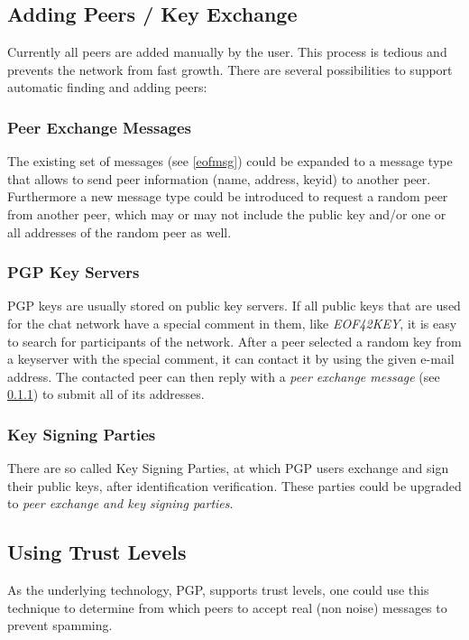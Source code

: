 \subsection{Adding Peers / Key Exchange}
\label{keyexchange}
Currently all peers are added manually by the user. 
This process is tedious and prevents the network from fast growth.
There are several possibilities to support automatic finding and
adding peers:
\subsubsection{Peer Exchange Messages}
\label{peerexchange}
The existing set of messages (see \ref{eofmsg}) could be expanded to a message
type that allows to send peer information (name, address, keyid) to another
peer. Furthermore a new message type could be introduced to request a random
peer from another peer, which may or may not include the public key 
and/or one or all addresses of the random peer as well.
\subsubsection{PGP Key Servers}
PGP keys are usually stored on public key servers.
If all public keys that are used for the chat network have a special comment
in them, like \textit{EOF42KEY}, it is easy to search for participants of the
network. After a peer selected a random key from a keyserver with the
special comment, it can contact it by using the given e-mail address.
The contacted peer can then reply with a \textit{peer exchange message}
(see \ref{peerexchange}) to submit all of its addresses.
\subsubsection{Key Signing Parties}
There are so called Key Signing Parties, at which PGP users exchange and
sign their public keys, after identification verification.
These parties could be upgraded to \textit{peer exchange and key signing
parties}.
\subsection{Using Trust Levels}
As the underlying technology, PGP, supports trust levels, one could use this
technique to determine from which peers to accept real (non noise)
messages to prevent spamming.
